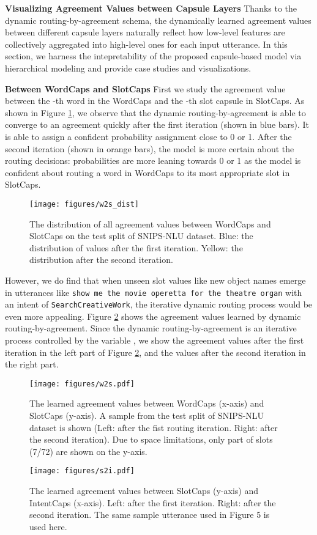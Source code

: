 \documentclass[11pt,a4paper,hyphens]{article}
\begin{document}
\noindent\textbf{Visualizing Agreement Values between Capsule Layers}
Thanks to the dynamic routing-by-agreement schema, the dynamically learned agreement values between different capsule layers naturally reflect how low-level features are collectively aggregated into high-level ones for each input utterance. In this section, we harness the intepretability of the proposed capsule-based model via hierarchical modeling and provide case studies and visualizations.

\textbf{Between WordCaps and SlotCaps}
First we study the agreement value  between the -th word in the WordCaps and the -th slot capsule in SlotCaps.
As shown in Figure \ref{fig:w2s_dist}, we observe that the dynamic routing-by-agreement is able to converge to an agreement quickly after the first iteration (shown in blue bars). It is able to assign a confident probability assignment close to 0 or 1. After the second iteration (shown in orange bars), the model is more certain about the routing decisions: probabilities are more leaning towards 0 or 1 as the model is confident about routing a word in WordCaps to its most appropriate slot in SlotCaps.

\begin{figure}[h]
    \centering
    \texttt{[image: figures/w2s\_dist]}
    \caption{The distribution of all agreement values between WordCaps and SlotCaps on the test split of SNIPS-NLU dataset. Blue: the distribution of values after the first iteration. Yellow: the distribution after the second iteration.}
    \label{fig:w2s_dist}
\end{figure}

However, we do find that when unseen slot values like new object names emerge in utterances like \texttt{show me the movie operetta for the theatre organ} with an intent of \texttt{SearchCreativeWork}, the iterative dynamic routing process would be even more appealing.
Figure \ref{fig:w2s} shows the agreement values learned by dynamic routing-by-agreement. Since the dynamic routing-by-agreement is an iterative process controlled by the variable , we show the agreement values after the first iteration in the left part of Figure \ref{fig:w2s}, and the values after the second iteration in the right part.
 
\begin{figure}[t!]
    \centering
    \texttt{[image: figures/w2s.pdf]}
    \caption{The learned agreement values between WordCaps (x-axis) and SlotCaps (y-axis). A sample from the test split of SNIPS-NLU dataset is shown (Left: after the fist routing iteration. Right: after the second iteration). Due to space limitations, only part of slots (7/72) are shown on the y-axis.}
    \label{fig:w2s}
\end{figure}
\begin{figure}[t!]
    \centering
    \texttt{[image: figures/s2i.pdf]}
    \caption{The learned agreement values between SlotCaps (y-axis) and IntentCaps (x-axis). Left: after the first iteration. Right: after the second iteration. The same sample utterance used in Figure 5 is used here.}
    \label{fig:s2i}
    \vspace{-0.3in}
\end{figure}
\end{document}
